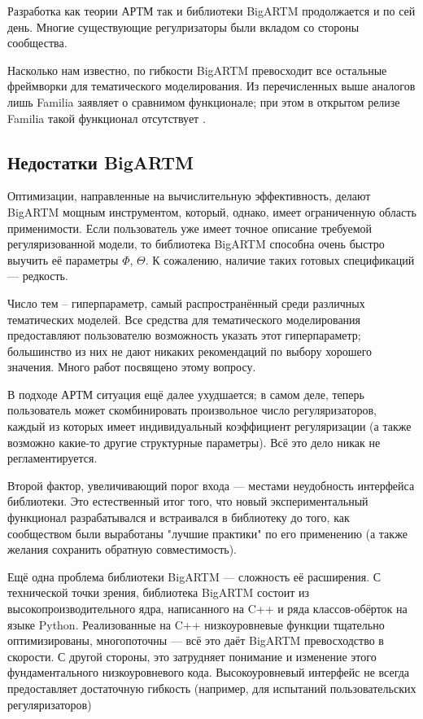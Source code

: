 Разработка как теории АРТМ так и библиотеки \mbox{BigARTM} продолжается и по сей день. Многие существующие регулризаторы были вкладом со стороны сообщества.

Насколько нам известно, по гибкости BigARTM превосходит все остальные фреймворки для тематического моделирования. Из перечисленных выше аналогов лишь Familia заявляет о сравнимом функционале; при этом в открытом релизе Familia такой функционал отсутствует \cite{familia_github}.

\subsection{Недостатки BigARTM}

Оптимизации, направленные на вычислительную эффективность, делают BigARTM мощным инструментом, который, однако, имеет ограниченную область применимости. Если пользователь уже имеет точное описание требуемой регуляризованной модели, то библиотека BigARTM способна очень быстро выучить её параметры $\Phi$, $\Theta$. К сожалению, наличие таких готовых спецификаций --- редкость.

Число тем -- гиперпараметр, самый распространённый среди различных тематических моделей. Все средства для тематического моделирования предоставляют пользователю возможность указать этот гиперпараметр; большинство из них не дают никаких рекомендаций по выбору хорошего значения. Много работ посвящено этому вопросу.

В подходе АРТМ ситуация ещё далее ухудшается; в самом деле, теперь пользователь может скомбинировать произвольное число регуляризаторов, каждый из которых имеет индивидуальный коэффициент регуляризации (а также возможно какие-то другие структурные параметры). Всё это дело никак не регламентируется.

Второй фактор, увеличивающий порог входа --- местами неудобность интерфейса библиотеки. Это естественный итог того, что новый экспериментальный функционал разрабатывался и встраивался в библиотеку до того, как сообществом были выработаны "лучшие практики" по его применению (а также желания сохранить обратную совместимость). 


Ещё одна проблема библиотеки BigARTM --- сложность её расширения. С технической точки зрения, библиотека BigARTM состоит из высокопроизводительного ядра, написанного на C++ и ряда классов-обёрток на языке Python. Реализованные на C++ низкоуровневые функции тщательно оптимизированы, многопоточны --- всё это даёт BigARTM превосходство в скорости. С другой стороны, это затрудняет понимание и изменение этого фундаментального низкоуровневого кода. Высокоуровневый интерфейс не всегда предоставляет достаточную гибкость (например, для испытаний пользовательских регуляризаторов)

